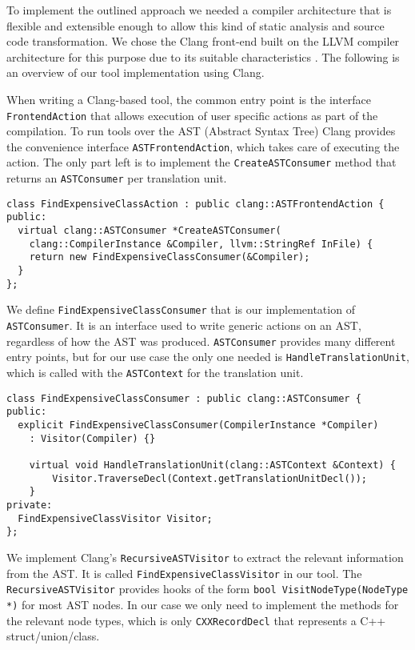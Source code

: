 \documentclass{article}
\begin{document}
To implement the outlined approach we needed a compiler architecture that is flexible and extensible enough to allow this kind of static analysis and source code transformation. We chose the Clang front-end built on the LLVM compiler architecture for this purpose due to its suitable characteristics \cite{lattner:clang}. The following is an overview of our tool implementation using Clang.

When writing a Clang-based tool, the common entry point is the interface \texttt{FrontendAction} that allows execution of user specific actions as part of the compilation. To run tools over the AST (Abstract Syntax Tree) Clang provides the convenience interface \texttt{ASTFrontendAction}, which takes care of executing the action. The only part left is to implement the \texttt{CreateASTConsumer} method that returns an \texttt{ASTConsumer} per translation unit.

\begin{verbatim}
class FindExpensiveClassAction : public clang::ASTFrontendAction {
public:
  virtual clang::ASTConsumer *CreateASTConsumer(
  	clang::CompilerInstance &Compiler, llvm::StringRef InFile) {
    return new FindExpensiveClassConsumer(&Compiler);
  }
};
\end{verbatim}

We define \texttt{FindExpensiveClassConsumer} that is our implementation of \texttt{ASTConsumer}. It is an interface used to write generic actions on an AST, regardless of how the AST was produced. \texttt{ASTConsumer} provides many different entry points, but for our use case the only one needed is \texttt{HandleTranslationUnit}, which is called with the \texttt{ASTContext} for the translation unit.

\begin{verbatim}
class FindExpensiveClassConsumer : public clang::ASTConsumer {
public:
  explicit FindExpensiveClassConsumer(CompilerInstance *Compiler)
    : Visitor(Compiler) {}

    virtual void HandleTranslationUnit(clang::ASTContext &Context) {
        Visitor.TraverseDecl(Context.getTranslationUnitDecl());
    }
private:
  FindExpensiveClassVisitor Visitor;
};
\end{verbatim}

We implement Clang's \texttt{RecursiveASTVisitor} to extract the relevant information from the AST. It is called \texttt{FindExpensiveClassVisitor} in our tool.
The \texttt{RecursiveASTVisitor} provides hooks of the form \texttt{bool VisitNodeType(NodeType *)} for most AST nodes. In our case we only need to implement the methods for the relevant node types, which is only \texttt{CXXRecordDecl} that represents a C++ struct/union/class.
\end{document}
